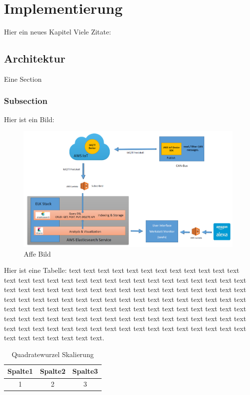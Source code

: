 \chapter{Implementierung}
    Hier ein neues Kapitel
    Viele Zitate: \cite{patterson} \cite{krizhevsky} \cite{matlab} \cite{pitts} \cite{lawrence} \cite{miesbach}
    \section{Architektur}
        Eine Section
        \subsection{Subsection}
        
        
Hier ist ein Bild:        
            \begin{figure}[h]
                \includegraphics[scale=0.2]{Abbildungen/Kapitel4/Big-architecture.png}
                \centering
                \caption{Affe Bild}
                \label{Abb:Affe}   
            \end{figure}  
            
Hier ist eine Tabelle: text text text text text text text text text text text text text text text text text text text text text text text text text text text text text text text text text text text text text text text text text text text text text text text text text text text text text text text text text text text text text text text text text text text text text text text text text text text text text text text text text text text text text text text text text text text text text text text text text text text text text text text text text text text text text text text text text text text text text text text text text.           
            
             \begin{table}[h]
                \begin{tabular}{ccc}
                      \hline
                      Spalte1 & Spalte2 & Spalte3\\                      
                      \hline
                      1 & 2 & 3\\
                      \hline
                \end{tabular}
                \centering
                \caption{Quadratewurzel Skalierung}
                \label{Tab:Quadratewurzel Skalierung}
            \end{table}
            
